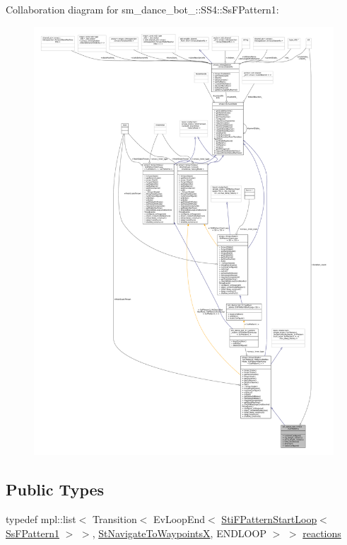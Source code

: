 Collaboration diagram for sm\+\_\+dance\+\_\+bot\+\_\+:\+:S\+S4\+:\+:Ss\+F\+Pattern1\+:
\nopagebreak
\begin{figure}[H]
\begin{center}
\leavevmode
\includegraphics[width=350pt]{structsm__dance__bot__3_1_1SS4_1_1SsFPattern1__coll__graph}
\end{center}
\end{figure}
\subsection*{Public Types}
\begin{DoxyCompactItemize}
\item 
typedef mpl\+::list$<$ Transition$<$ Ev\+Loop\+End$<$ \hyperlink{structsm__dance__bot__3_1_1f__pattern__states_1_1StiFPatternStartLoop}{Sti\+F\+Pattern\+Start\+Loop}$<$ \hyperlink{structsm__dance__bot__3_1_1SS4_1_1SsFPattern1}{Ss\+F\+Pattern1} $>$ $>$, \hyperlink{structsm__dance__bot__3_1_1StNavigateToWaypointsX}{St\+Navigate\+To\+WaypointsX}, E\+N\+D\+L\+O\+OP $>$ $>$ \hyperlink{structsm__dance__bot__3_1_1SS4_1_1SsFPattern1_ad356150da2dd523738a528c296b5d634}{reactions}
\end{DoxyCompactItemize}
